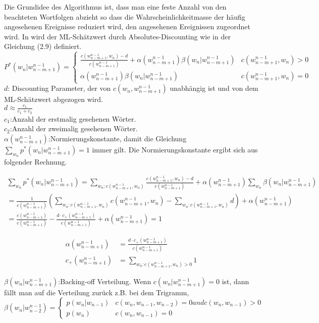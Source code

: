 Die Grundidee des Algorithmus ist, dass man eine feste Anzahl von den beachteten Wortfolgen abzieht so dass die Wahrscheinlichkeitmasse der h\"aufig angesehenen Ereignisse reduziert wird, den angesehenen Ereignissen zugeordnet wird. In \cite{ars_script} wird der ML-Sch\"atzwert durch Absolutes-Discounting wie in der Gleichung (2.9) definiert.
\begin{equation}
P^{*}(w_{n}|w_{n-m+1}^{n-1})=\begin{cases}
\frac{c(w_{n-m+1}^{n-1},w_{n})-d}{c(w_{n-m+1}^{n-1})}+\alpha (w_{n-m+1}^{n-1})\beta (w_{n}|w_{n-m+1}^{n-1}) & c(w_{n-m+1}^{n-1},w_{n})>0 \\
\alpha (w_{n-m+1}^{n-1})\beta (w_{n}|w_{n-m+1}^{n-1}) & c(w_{n-m+1}^{n-1},w_{n})=0 
\end{cases}
\end{equation}
$d$: Discounting Parameter, der von $c(w_{n},w_{n-m+1}^{n-1})$ unabh\"angig ist und von dem ML-Sch\"atzwert abgezogen wird.\\
$d\approx \frac{c_{1}}{c_{1}+c_{2}}$ \\
$c_{1}$:Anzahl der erstmalig gesehenen W\"orter.\\
$c_{2}$:Anzahl der zweimalig gesehenen W\"orter.\\
$\alpha (w_{n-m+1}^{n-1})$:Normierungskonstante, damit die Gleichung $\sum_{w_{n}}p^{*}(w_{n}|w_{n-m+1}^{n-1})=1$ immer gilt. Die Normierungskonstante ergibt sich aus folgender Rechnung.

\begin{multline}
\sum_{w_{n}}p^{*}(w_{n}|w_{n-m+1}^{n-1})=\sum_{w_{n}:c(w_{n-m+1}^{n-1},w_{n})}\frac{c(w_{n-m+1}^{n-1},w_{n})-d}{c(w_{n-m+1}^{n-1})}+\alpha(w_{n-m+1}^{n-1})\sum_{w_{n}}\beta (w_{n}|w_{n-m+1}^{n-1})\\
=\frac{1}{c(w_{n-m+1}^{n-1})}(\sum_{w_{n}:c(w_{n-m+1}^{n-1},w_{n})}c(w_{n-m+1}^{n-1},w_{n})-\sum_{w_{n}:c(w_{n-m+1}^{n-1},w_{n})}d)+\alpha (w_{n-m+1}^{n-1})\\
=\frac{c(w_{n-m+1}^{n-1})}{c(w_{n-m+1}^{n-1})}-\frac{d\cdot c_{+}(w_{n-m+1}^{n-1})}{c(w_{n-m+1}^{n-1})}+\alpha (w_{n-m+1}^{n-1})=1
\end{multline}

\begin{align}
\alpha (w_{n-m+1}^{n-1}) &=\frac{d\cdot c_{+}(w_{n-m+1}^{n-1})}{c(w_{n-m+1}^{n-1})}\\
c_{+}(w_{n-m+1}^{n-1}) &=\sum_{w_{n}:c(w_{n-m+1}^{n-1},w_{n})>0}1
\end{align}


$\beta (w_{n}|w_{n-m+1}^{n-1})$:Backing-off Verteilung. Wenn $c(w_{n}|w_{n-m+1}^{n-1})=0$ ist, dann f\"allt man auf die Verteilung zur\"uck
z.B. bei dem Trigramm,\\

\begin{equation}
\beta (w_{n}|w_{n-2}^{n-1})=\begin{cases}
p(w_{n}|w_{n-1}) & c(w_{n},w_{n-1},w_{n-2})=0 and c(w_{n},w_{n-1})>0 \\
p(w_{n}) & c(w_{n},w_{n-1})=0 
\end{cases}
\end{equation}

